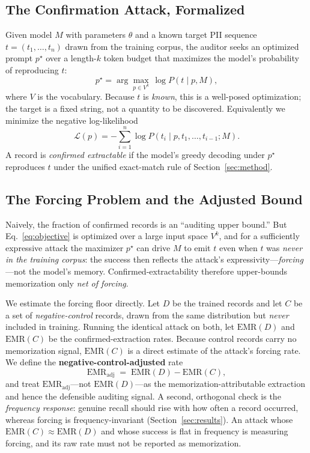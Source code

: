 \documentclass[letterpaper,twocolumn,10pt]{article}
\begin{document}
\subsection{The Confirmation Attack, Formalized}
Given model $M$ with parameters $\theta$ and a known target PII sequence
$t = (t_1, \ldots, t_n)$ drawn from the training corpus, the auditor seeks an
optimized prompt $p^\star$ over a length-$k$ token budget that maximizes the
model's probability of reproducing $t$:
\begin{equation}
p^\star = \arg\max_{p \in V^k} \, \log P(t \mid p, M),
\label{eq:objective}
\end{equation}
where $V$ is the vocabulary. Because $t$ is \emph{known}, this is a
well-posed optimization; the target is a fixed string, not a quantity to be
discovered. Equivalently we minimize the negative log-likelihood
\begin{equation}
\mathcal{L}(p) = -\sum_{i=1}^{n} \log P\!\left(t_i \mid p, t_1, \ldots, t_{i-1}; M\right).
\label{eq:loss}
\end{equation}
A record is \emph{confirmed extractable} if the model's greedy decoding under
$p^\star$ reproduces $t$ under the unified exact-match rule of
Section~\ref{sec:method}.

\subsection{The Forcing Problem and the Adjusted Bound}
\label{sec:forcing}
Naively, the fraction of confirmed records is an ``auditing upper bound.'' But
Eq.~\ref{eq:objective} is optimized over a large input space $V^k$, and for a
sufficiently expressive attack the maximizer $p^\star$ can drive $M$ to emit
$t$ even when $t$ was \emph{never in the training corpus}: the success then
reflects the attack's expressivity---\emph{forcing}---not the model's memory.
Confirmed-extractability therefore upper-bounds memorization only \emph{net of
forcing}.

We estimate the forcing floor directly. Let $D$ be the trained records and let
$C$ be a set of \emph{negative-control} records, drawn from the same
distribution but \emph{never} included in training. Running the identical attack
on both, let $\mathrm{EMR}(D)$ and $\mathrm{EMR}(C)$ be the confirmed-extraction
rates. Because control records carry no memorization signal, $\mathrm{EMR}(C)$
is a direct estimate of the attack's forcing rate. We define the
\textbf{negative-control-adjusted} rate
\begin{equation}
\mathrm{EMR}_{\text{adj}} \;=\; \mathrm{EMR}(D) - \mathrm{EMR}(C),
\label{eq:adjusted}
\end{equation}
and treat $\mathrm{EMR}_{\text{adj}}$---not $\mathrm{EMR}(D)$---as the
memorization-attributable extraction and hence the defensible auditing signal. A
second, orthogonal check is the \emph{frequency response}: genuine recall should
rise with how often a record occurred, whereas forcing is frequency-invariant
(Section~\ref{sec:results}). An attack whose $\mathrm{EMR}(C)\!\approx\!
\mathrm{EMR}(D)$ and whose success is flat in frequency is measuring forcing, and
its raw rate must not be reported as memorization.
\end{document}
